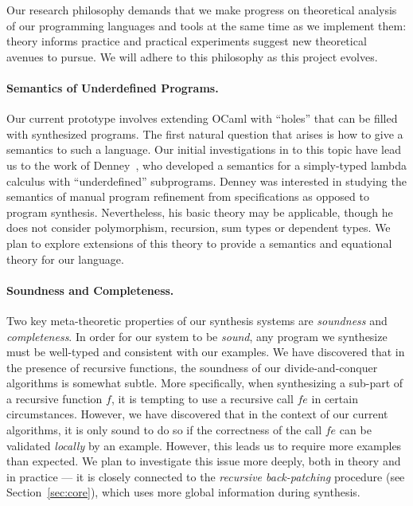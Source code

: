 Our research philosophy demands that we make progress on theoretical
analysis of our programming languages and tools at the same time as
we implement them:  theory informs practice and practical experiments
suggest new theoretical avenues to pursue.  We will adhere to this
philosophy as this project evolves.

\paragraph*{Semantics of Underdefined Programs.}
Our current prototype involves extending OCaml with ``holes'' that
can be filled with synthesized programs.  The first natural question
that arises is how to give a semantics to such a language.  Our
initial investigations in to this topic have lead us to the work of
Denney~\cite{denney:underdeterminism}, who developed a semantics for a simply-typed
lambda calculus with ``underdefined'' subprograms.  Denney was interested
in studying the semantics of manual program refinement from specifications 
as opposed to program synthesis.  Nevertheless, his basic theory may be 
applicable, though he does not consider polymorphism, recursion, sum
types or dependent types.  We plan to explore extensions of this theory 
to provide a semantics and equational theory for our language.

\paragraph*{Soundness and Completeness.}
Two key meta-theoretic properties of our synthesis systems are
\emph{soundness} and \emph{completeness}.  In order for our system
to be \emph{sound}, any program we synthesize must be well-typed
and consistent with our examples.  We have discovered that in the
presence of recursive functions, the soundness of our divide-and-conquer
algorithms is somewhat subtle.  More specifically, when synthesizing
a sub-part of a recursive function $f$, it is tempting to use a recursive
call $f e$ in certain circumstances.  However, we have discovered that in
the context of our current algorithms, it is
only sound to do so if the correctness of the call $f e$ can be validated
\emph{locally} by an example.  However, this leads us to require more examples
than expected.  We plan to investigate this issue more deeply, both in
theory and in practice --- it is closely connected to the 
\emph{recursive back-patching} procedure (see Section~\ref{sec:core}), 
which uses more global
information during synthesis.  

